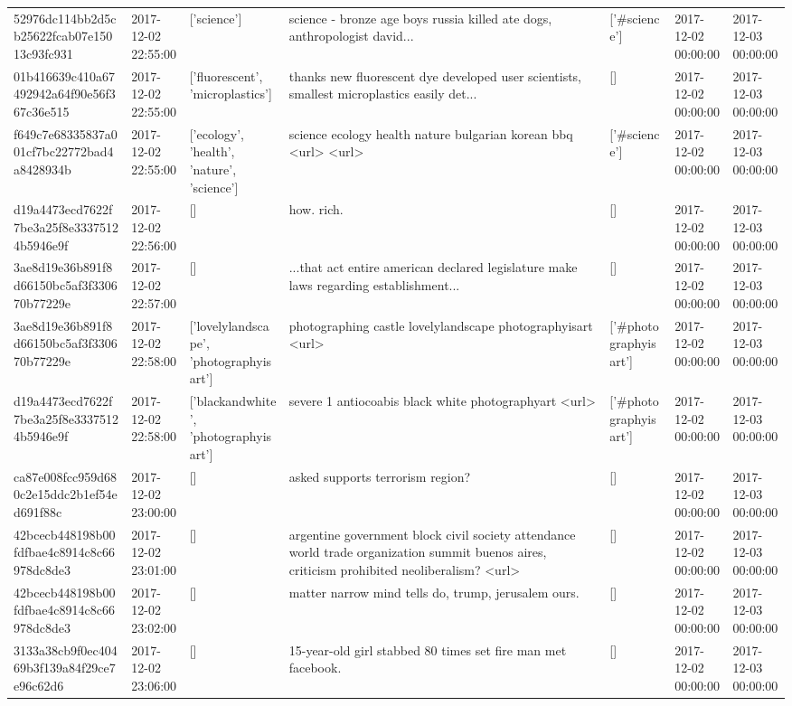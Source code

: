 \begin{tabular}{lllllll}
52976dc114bb2d5cb25622fcab07e15013c93fc931 & 2017-12-02 22:55:00 & ['science'] & science - bronze age boys russia killed ate dogs, anthropologist david... & ['#science'] & 2017-12-02 00:00:00 & 2017-12-03 00:00:00 \\
01b416639c410a67492942a64f90e56f367c36e515 & 2017-12-02 22:55:00 & ['fluorescent', 'microplastics'] & thanks new fluorescent dye developed user scientists, smallest microplastics easily det... & [] & 2017-12-02 00:00:00 & 2017-12-03 00:00:00 \\
f649c7e68335837a001cf7bc22772bad4a8428934b & 2017-12-02 22:55:00 & ['ecology', 'health', 'nature', 'science'] & science ecology health nature bulgarian korean bbq <url> <url> & ['#science'] & 2017-12-02 00:00:00 & 2017-12-03 00:00:00 \\
d19a4473ecd7622f7be3a25f8e33375124b5946e9f & 2017-12-02 22:56:00 & [] & how. rich. & [] & 2017-12-02 00:00:00 & 2017-12-03 00:00:00 \\
3ae8d19e36b891f8d66150bc5af3f330670b77229e & 2017-12-02 22:57:00 & [] & ...that act entire american declared legislature make laws regarding establishment... & [] & 2017-12-02 00:00:00 & 2017-12-03 00:00:00 \\
3ae8d19e36b891f8d66150bc5af3f330670b77229e & 2017-12-02 22:58:00 & ['lovelylandscape', 'photographyisart'] & photographing castle lovelylandscape photographyisart <url> & ['#photographyisart'] & 2017-12-02 00:00:00 & 2017-12-03 00:00:00 \\
d19a4473ecd7622f7be3a25f8e33375124b5946e9f & 2017-12-02 22:58:00 & ['blackandwhite', 'photographyisart'] & severe 1 antiocoabis black white photographyart <url> & ['#photographyisart'] & 2017-12-02 00:00:00 & 2017-12-03 00:00:00 \\
ca87e008fcc959d680c2e15ddc2b1ef54ed691f88c & 2017-12-02 23:00:00 & [] & asked supports terrorism region? & [] & 2017-12-02 00:00:00 & 2017-12-03 00:00:00 \\
42bcecb448198b00fdfbae4c8914c8c66978dc8de3 & 2017-12-02 23:01:00 & [] & argentine government block civil society attendance world trade organization summit buenos aires, criticism prohibited neoliberalism? <url> & [] & 2017-12-02 00:00:00 & 2017-12-03 00:00:00 \\
42bcecb448198b00fdfbae4c8914c8c66978dc8de3 & 2017-12-02 23:02:00 & [] & matter narrow mind tells do, trump, jerusalem ours. & [] & 2017-12-02 00:00:00 & 2017-12-03 00:00:00 \\
3133a38cb9f0ec40469b3f139a84f29ce7e96c62d6 & 2017-12-02 23:06:00 & [] & 15-year-old girl stabbed 80 times set fire man met facebook. & [] & 2017-12-02 00:00:00 & 2017-12-03 00:00:00 \\

\end{tabular}
